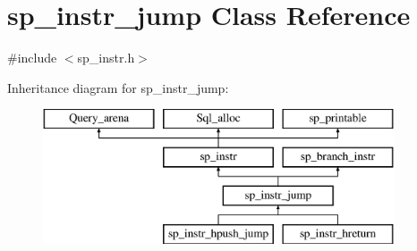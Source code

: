 \hypertarget{classsp__instr__jump}{}\section{sp\+\_\+instr\+\_\+jump Class Reference}
\label{classsp__instr__jump}


{\ttfamily \#include $<$sp\+\_\+instr.\+h$>$}

Inheritance diagram for sp\+\_\+instr\+\_\+jump\+:\begin{figure}[H]
\begin{center}
\leavevmode
\includegraphics[height=4.000000cm]{classsp__instr__jump}
\end{center}
\end{figure}
